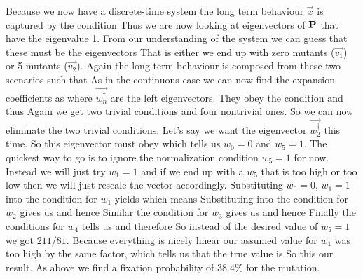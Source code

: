 Because we now have a discrete-time system the long term behaviour $\vec{x}$ is captured by the condition 
Thus we are now looking at eigenvectors of $\bf P$ that have the eigenvalue 1. From our understanding of the system we can guess that these must be the eigenvectors 
That is either we end up with zero mutants ($\vec{v_1}$) or 5 mutants ($\vec{v_2}$). Again the long term behaviour is composed from these two scenarios such that  
As in the continuous case we can now find the expansion coefficients as 
where $\vec{w_n^\dag}$ are the left eigenvectors. They obey the condition 
and thus 
Again we get two trivial conditions and four nontrivial ones. So we can now eliminate the two trivial conditions. Let's say we want the eigenvector $\vec{w_2^\dag}$ this time. So this eigenvector must obey 
which tells us $w_0=0$ and $w_5=1$. The quickest way to go is to ignore the normalization condition $w_5=1$ for now. Instead we will just try $w_1=1$ and if we end up with a $w_5$ that is too high or too low then we will just rescale the vector accordingly. Substituting $w_0=0$, $w_1=1$ into the condition for $w_1$ yields 
which means 
Substituting into the condition for $w_2$ gives us 
and hence 
Similar the condition for $w_3$ gives us 
and hence 
Finally the conditions for $w_4$ tells us
and therefore 
So instead of the desired value of $w_5=1$ we got $211/81$. Because everything is nicely linear our assumed value for $w_1$ was too high by the same factor, which tells us that the true value is 
So this our result. As above we find a fixation probability of 38.4\% for the mutation. 


